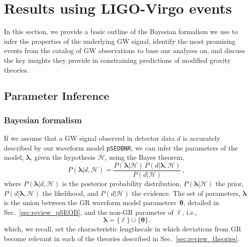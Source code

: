 \documentclass[twocolumn,prd,aps,superscriptaddress,preprintnumbers,tightenlines,showpacs,nofootinbib,amsfonts,amsmath,longbibliography]{revtex4-1}
\newcommand{\pSEOB}{\texttt{pSEOBNR}}
\newcommand{\hs}[1]{{\textcolor{blue}{{[HS: #1]}} }}
\begin{document}

\section{Results using LIGO-Virgo events}
\label{sec:results}

In this section, we provide a basic outline of the Bayesian formalism we use to
infer the properties of the underlying GW signal, identify the most promising
events from the catalog of GW observations to base our analyses on, and discuss
the key insights they provide in constraining predictions of modified gravity
theories.

\subsection{Parameter Inference}

\subsubsection{Bayesian formalism}
If we assume that a GW signal observed in detector data $d$ is accurately
described by our waveform model \pSEOB{}, we can infer the parameters of the
model, $\bm{\lambda}$, given the hypothesis $\mathcal{H}$, using the Bayes
theorem,
%
\begin{equation}
P(\bm{\lambda} \vert d, \mathcal{H}) =
\frac{P(\bm{\lambda} \vert \mathcal{H}) \, P(d \vert \bm{\lambda},\mathcal{H})}{P(d \vert \mathcal{H})}\,,
\label{eq:bayes}
\end{equation}
%
where $P(\bm{\lambda} \vert d, \mathcal{H})$ is the posterior probability distribution,
$P(\bm{\lambda} \vert \mathcal{H})$ the prior,
$P(d \vert \bm{\lambda},\mathcal{H})$ the likelihood, and
$P(d \vert \mathcal{H})$ the evidence.
%
The set of parameters, $\bm{\lambda}$ is the union between the GR waveform
model parameters~$\bm{\theta}$, detailed in Sec.~\ref{sec:review_pSEOB}, and
the non-GR parameter of $\ell$, i.e.,
%
\begin{equation}
\bm{\lambda} = \{\ell\} \cup \{\bm{\theta}\}.
\end{equation}
%
which, we recall, set the characteristic lengthscale in which deviations from
GR become relevant in each of the theories described in
Sec.~\ref{sec:review_theories}.
\end{document}
